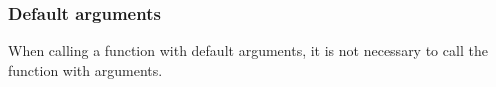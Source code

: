 \subsubsection{Default arguments}
    When calling a function with default arguments, it is not necessary to call the function with arguments.
    